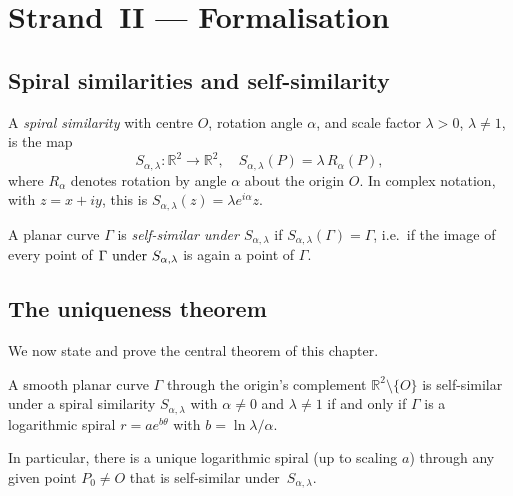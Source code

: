 \section{Strand~II — Formalisation}
\label{sec:17-strand2}

\subsection{Spiral similarities and self-similarity}
\label{subsec:17-selfsim}

\begin{definition}
\label{def:spiral-sim}
A \emph{spiral similarity} with centre \(O\), rotation angle
\(\alpha\), and scale factor \(\lambda > 0\), \(\lambda \neq 1\),
is the map
\[
  S_{\alpha,\lambda}: \mathbb{R}^2 \to \mathbb{R}^2, \quad
  S_{\alpha,\lambda}(P) = \lambda\, R_\alpha(P),
\]
where \(R_\alpha\) denotes rotation by angle \(\alpha\) about
the origin \(O\).  In complex notation, with \(z = x + iy\),
this is \(S_{\alpha,\lambda}(z) = \lambda e^{i\alpha} z\).
\end{definition}

\begin{definition}
\label{def:selfsim-curve}
A planar curve \(\Gamma\) is \emph{self-similar under
\(S_{\alpha,\lambda}\)} if \(S_{\alpha,\lambda}(\Gamma) =
\Gamma\), i.e.\ if the image of every point of \(\Gamma$ under
\(S_{\alpha,\lambda}\) is again a point of \(\Gamma\).
\end{definition}

\subsection{The uniqueness theorem}
\label{sec:17-strand2-theorem}

We now state and prove the central theorem of this chapter.

\begin{theorem}
\label{thm:logspiral-unique}
A smooth planar curve \(\Gamma\) through the origin's complement
\(\mathbb{R}^2 \setminus \{O\}\) is self-similar under a
spiral similarity \(S_{\alpha,\lambda}\) with \(\alpha \neq 0\)
and \(\lambda \neq 1\) if and only if \(\Gamma\) is a
logarithmic spiral \(r = a e^{b\theta}\) with
\(b = \ln\lambda / \alpha\).

In particular, there is a unique logarithmic spiral (up to
scaling \(a\)) through any given point
\(P_0 \neq O\) that is self-similar under~\(S_{\alpha,\lambda}\).
\end{theorem}

